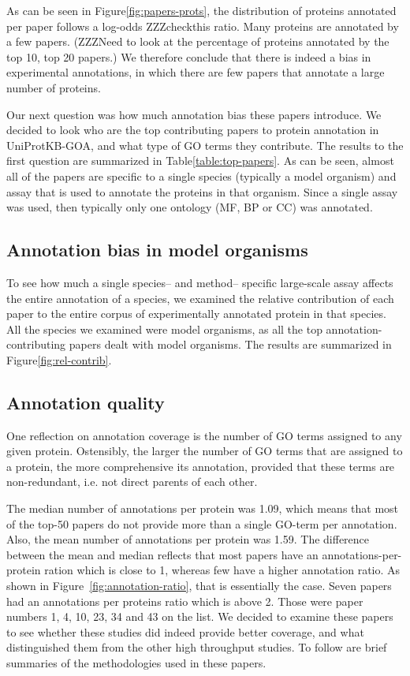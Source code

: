 \documentclass[10pt]{bmc_article}
\newenvironment{bmcformat}{\begin{raggedright}\baselineskip20pt\sloppy\setboolean{publ}{false}}{\end{raggedright}\baselineskip20pt\sloppy}
\begin{document}
\begin{bmcformat}
As can be seen in Figure\ref{fig:papers-prots}, the distribution of proteins
annotated per paper follows a log-odds ZZZcheckthis ratio.  Many proteins are annotated by a
few papers. (ZZZNeed to look at the percentage of proteins annotated by the top
10, top 20 papers.) We therefore conclude that there is indeed a bias in
experimental annotations, in which there are few papers that annotate a large
number of proteins.

Our next question was how much annotation bias these papers introduce. We decided
to look who are the top contributing papers to protein annotation in
UniProtKB-GOA, and what type of GO terms they contribute.  The results to the
first question are summarized in Table\ref{table:top-papers}.  As can be seen,
almost all of the papers are specific to a single species (typically a model
organism) and assay that is used to annotate the proteins in that organism. Since
a single assay was used, then typically only one ontology (MF, BP or CC) was
annotated. 
 
\subsection*{Annotation bias in model organisms}
To see how much a single species-- and method-- specific large-scale assay
affects the entire annotation of a species, we examined the relative contribution
of each paper to the entire corpus of experimentally annotated protein in that species.
All the species we examined were model organisms, as all the top annotation-contributing papers
dealt with model organisms. 
The results are summarized in Figure\ref{fig:rel-contrib}.

\subsection*{Annotation quality}

One reflection on annotation coverage is the number of GO terms assigned to any
given protein. Ostensibly, the larger the number of GO terms that are assigned to a
protein, the more comprehensive its annotation, provided that these terms are
non-redundant, i.e.  not direct parents of each other. 

The median number of annotations per protein was 1.09, which means that most of the top-50
papers do not provide more than a single GO-term per annotation. Also, the mean number of
annotations per protein was 1.59. The difference between the mean and median reflects that
most papers have an annotations-per-protein ration which is close to 1, whereas few have a
higher annotation ratio. As shown in Figure~\ref{fig:annotation-ratio}, that is essentially
the case. Seven papers had an annotations per proteins ratio which is above 2. Those
were paper numbers 1, 4, 10, 23, 34 and 43 on the list. We decided to examine these papers
to see whether these studies did indeed provide better coverage, and what distinguished them
from the other high throughput studies. To follow are brief summaries of the
methodologies used in these papers.


\end{bmcformat}
\end{document}
